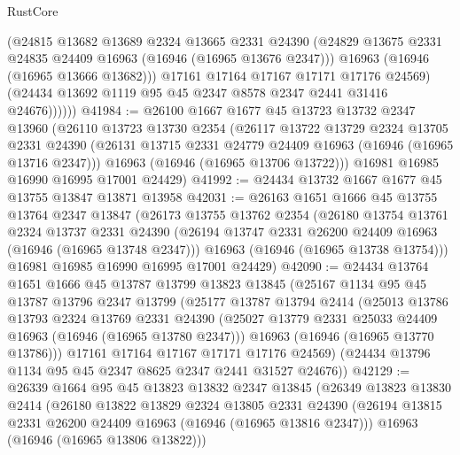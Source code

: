 \begin{lexlean}{RustCore}
\begin{coremodule}
                (@24815
                  @13682
                  @13689
                  @2324
                  @13665
                  @2331
                  @24390
                  (@24829 @13675 @2331 @24835 @24409 @16963 (@16946 (@16965 @13676 @2347)))
                  @16963
                  (@16946 (@16965 @13666 @13682)))
                @17161
                @17164
                @17167
                @17171
                @17176
                @24569)
              (@24434 @13692 @1119 @95 @45 @2347 @8578 @2347 @2441 @31416 @24676))))))
@41984 := @26100
    @1667
    @1677
    @45
    @13723
    @13732
    @2347
    @13960
    (@26110
      @13723
      @13730
      @2354
      (@26117
        @13722
        @13729
        @2324
        @13705
        @2331
        @24390
        (@26131 @13715 @2331 @24779 @24409 @16963 (@16946 (@16965 @13716 @2347)))
        @16963
        (@16946 (@16965 @13706 @13722)))
      @16981
      @16985
      @16990
      @16995
      @17001
      @24429)
@41992 := @24434 @13732 @1667 @1677 @45 @13755 @13847 @13871 @13958
@42031 := @26163
    @1651
    @1666
    @45
    @13755
    @13764
    @2347
    @13847
    (@26173
      @13755
      @13762
      @2354
      (@26180
        @13754
        @13761
        @2324
        @13737
        @2331
        @24390
        (@26194 @13747 @2331 @26200 @24409 @16963 (@16946 (@16965 @13748 @2347)))
        @16963
        (@16946 (@16965 @13738 @13754)))
      @16981
      @16985
      @16990
      @16995
      @17001
      @24429)
@42090 := @24434
    @13764
    @1651
    @1666
    @45
    @13787
    @13799
    @13823
    @13845
    (@25167
      @1134
      @95
      @45
      @13787
      @13796
      @2347
      @13799
      (@25177
        @13787
        @13794
        @2414
        (@25013
          @13786
          @13793
          @2324
          @13769
          @2331
          @24390
          (@25027 @13779 @2331 @25033 @24409 @16963 (@16946 (@16965 @13780 @2347)))
          @16963
          (@16946 (@16965 @13770 @13786)))
        @17161
        @17164
        @17167
        @17171
        @17176
        @24569)
      (@24434 @13796 @1134 @95 @45 @2347 @8625 @2347 @2441 @31527 @24676))
@42129 := @26339
    @1664
    @95
    @45
    @13823
    @13832
    @2347
    @13845
    (@26349
      @13823
      @13830
      @2414
      (@26180
        @13822
        @13829
        @2324
        @13805
        @2331
        @24390
        (@26194 @13815 @2331 @26200 @24409 @16963 (@16946 (@16965 @13816 @2347)))
        @16963
        (@16946 (@16965 @13806 @13822)))

\end{coremodule}
\end{lexlean}
